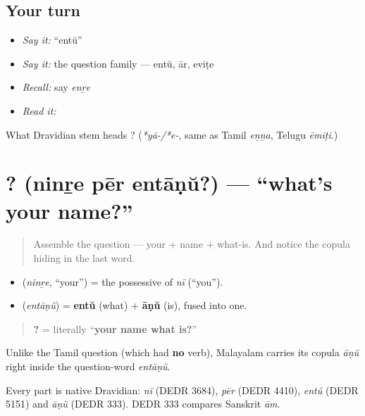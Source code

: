 \subsection*{Your turn}
\begin{itemize}
\raggedright
  \item \emph{Say it:} \textquotedblleft{}entŭ\textquotedblright{}
  \item \emph{Say it:} the question family — entŭ, ār, eviṭe
  \item \emph{Recall:} say \emph{enṟe}
  \item \emph{Read it:} \textbf{}
\end{itemize}

\begin{tcolorbox}[breakable,colback=teal!4,colframe=teal!35!black,title={Before you move on}]
What Dravidian stem heads \textbf{}? (\emph{*yā-/*e-}, same as Tamil \emph{eṉṉa}, Telugu \emph{ēmiṭi}.)
\end{tcolorbox}
\section[\texorpdfstring{\ml{നിന്റെ} \ml{പേര്} \ml{എന്താണ്}? (ninṟe pēr entāṇŭ?)}{നിന്റെ പേര് എന്താണ്? (ninṟe pēr entāṇŭ?)}]{  ? (ninṟe pēr entāṇŭ?) — \textquotedblleft{}what's your name?\textquotedblright{}}

\label{lesson:ML-C02-ninre-peru-entaanu}



\begin{quote}
Assemble the question — your + name + what-is. And notice the copula hiding in the last word.
\end{quote}

\begin{cousinweb}
\begin{itemize}
\raggedright
  \item \textbf{} (\emph{ninṟe}, \textquotedblleft{}your\textquotedblright{}) = the possessive of \emph{nī} (\textquotedblleft{}you\textquotedblright{}).
  \item \textbf{} (\emph{entāṇŭ}) = \textbf{entŭ} (what) + \textbf{āṇŭ} (is), fused into one.
\end{itemize}

\begin{quote}
\textbf{  ?} = literally \textquotedblleft{}\textbf{your name what is?}\textquotedblright{}
\end{quote}

Unlike the Tamil question (which had \textbf{no} verb), Malayalam carries its copula \emph{āṇŭ} right inside the question-word \emph{entāṇŭ}.

Every part is native Dravidian: \emph{nī} (DEDR 3684), \emph{pēr} (DEDR 4410), \emph{entŭ} (DEDR 5151) and \emph{āṇŭ} (DEDR 333). DEDR 333 compares Sanskrit \emph{ām}.
\end{cousinweb}

